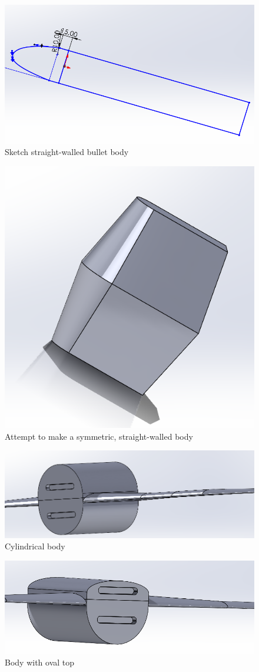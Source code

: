 \begin{figure}
    \centering
    \includegraphics[width=0.5\linewidth]{images/Unfinished bullet.png}
    \caption{Sketch straight-walled bullet body}
    \label{fig:Unfinished bullet}
\end{figure}

\begin{figure}
    \centering
    \includegraphics[width=0.5\linewidth]{images/Eehm...no.png}
    \caption{Attempt to make a symmetric, straight-walled body}
    \label{fig:Eehm...no}
\end{figure}

\begin{figure}
    \centering
    \includegraphics[width=0.5\linewidth]{images/Cylindrical body.png}
    \caption{Cylindrical body}
    \label{fig:Cylindrical body}
\end{figure}

\begin{figure}
    \centering
    \includegraphics[width=0.5\linewidth]{images/Body oval top.png}
    \caption{Body with oval top}
    \label{fig:Oval top}
\end{figure}


